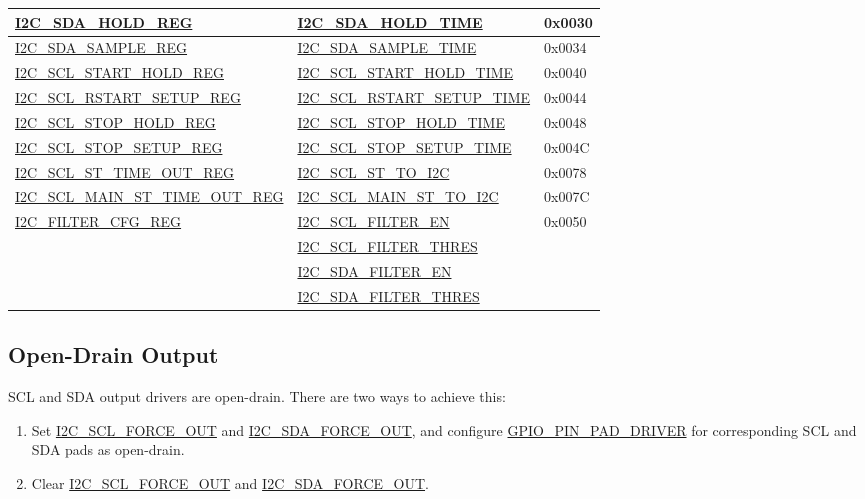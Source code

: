 \documentclass[main\_\_EN.tex]{subfiles}
\begin{document}
\begin{longtable}{ | p{6cm} | p{7cm} | p{2cm} | }
\hyperref[regdesc:I2CSDAHOLDREG]{I2C\_SDA\_HOLD\_REG} & \hyperref[fielddesc:I2CSDAHOLDTIME]{I2C\_SDA\_HOLD\_TIME} & 0x0030  \\\hline
\hyperref[regdesc:I2CSDASAMPLEREG]{I2C\_SDA\_SAMPLE\_REG} & \hyperref[fielddesc:I2CSDASAMPLETIME]{I2C\_SDA\_SAMPLE\_TIME} & 0x0034  \\ \hline

\hyperref[regdesc:I2CSCLSTARTHOLDREG]{I2C\_SCL\_START\_HOLD\_REG} & \hyperref[fielddesc:I2CSCLSTARTHOLDTIME]{I2C\_SCL\_START\_HOLD\_TIME} & 0x0040  \\ \hline
\hyperref[regdesc:I2CSCLRSTARTSETUPREG]{I2C\_SCL\_RSTART\_SETUP\_REG} & \hyperref[fielddesc:I2CSCLRSTARTSETUPTIME]{I2C\_SCL\_RSTART\_SETUP\_TIME} & 0x0044  \\ \hline

\hyperref[regdesc:I2CSCLSTOPHOLDREG]{I2C\_SCL\_STOP\_HOLD\_REG} & \hyperref[fielddesc:I2CSCLSTOPHOLDTIME]{I2C\_SCL\_STOP\_HOLD\_TIME} & 0x0048  \\ \hline
\hyperref[regdesc:I2CSCLSTOPSETUPREG]{I2C\_SCL\_STOP\_SETUP\_REG} & \hyperref[fielddesc:I2CSCLSTOPSETUPTIME]{I2C\_SCL\_STOP\_SETUP\_TIME} & 0x004C  \\ \hline

\hyperref[regdesc:I2CSCLSTTIMEOUTREG]{I2C\_SCL\_ST\_TIME\_OUT\_REG}& \hyperref[fielddesc:I2CSCLSTTOI2C]{I2C\_SCL\_ST\_TO\_I2C} & 0x0078\\ \hline
\hyperref[regdesc:I2CSCLMAINSTTIMEOUTREG]{I2C\_SCL\_MAIN\_ST\_TIME\_OUT\_REG}  & \hyperref[fielddesc:I2CSCLMAINSTTOI2C]{I2C\_SCL\_MAIN\_ST\_TO\_I2C} & 0x007C\\ \hline

\multirow{4}{*}{\hyperref[regdesc:I2CFILTERCFGREG]{I2C\_FILTER\_CFG\_REG}} & {\hyperref[fielddesc:I2CSCLFILTEREN]{I2C\_SCL\_FILTER\_EN}} & \multirow{4}{*}{0x0050}  \\\cline{2-2}
& {\hyperref[fielddesc:I2CSCLFILTERTHRES]{I2C\_SCL\_FILTER\_THRES}}& \\\cline{2-2}
& {\hyperref[fielddesc:I2CSDAFILTEREN]{I2C\_SDA\_FILTER\_EN}} &  \\\cline{2-2}
& {\hyperref[fielddesc:I2CSDAFILTERTHRES]{I2C\_SDA\_FILTER\_THRES}} & \\ \hline
\end{longtable}

\subsection{Open-Drain Output}
SCL and SDA output drivers are open-drain. There are two ways to achieve this: 
\begin{enumerate}
\item Set \hyperref[fielddesc:I2CSCLFORCEOUT]{I2C\_SCL\_FORCE\_OUT} and \hyperref[fielddesc:I2CSDAFORCEOUT]{I2C\_SDA\_FORCE\_OUT}, and configure \hyperref[fielddesc:GPIOPINNPADDRIVER]{GPIO\_PIN\_PAD\_DRIVER} for corresponding SCL and SDA pads as open-drain.
\item Clear \hyperref[fielddesc:I2CSCLFORCEOUT]{I2C\_SCL\_FORCE\_OUT} and \hyperref[fielddesc:I2CSDAFORCEOUT]{I2C\_SDA\_FORCE\_OUT}.
\end{enumerate}
\end{document}
